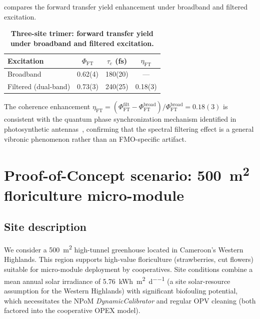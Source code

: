 \documentclass[11pt,a4paper]{article}
\begin{document}
 compares the forward transfer yield enhancement under broadband and filtered excitation.

\begin{table}[htbp]
\centering
\caption{\textbf{Three-site trimer: forward transfer yield under broadband and filtered excitation.}}
\label{tab:SI_trimer_results}
\begin{tabular}{l S[table-format=1.2(1)] S[table-format=3.0(2)] S[table-format=1.2(1)]}
\toprule
Excitation & {$\Phi_{\mathrm{FT}}$} & {$\tau_c$ (fs)} & {$\eta_{\mathrm{FT}}$} \\
\midrule
Broadband & 0.62(4) & 180(20) & {---} \\
Filtered (dual-band) & 0.73(3) & 240(25) & 0.18(3) \\
\bottomrule
\end{tabular}
\end{table}

The coherence enhancement $\eta_{\mathrm{FT}} = (\Phi_{\mathrm{FT}}^{\mathrm{filt}} - \Phi_{\mathrm{FT}}^{\mathrm{broad}}) / \Phi_{\mathrm{FT}}^{\mathrm{broad}} = 0.18(3)$ is consistent with the quantum phase synchronization mechanism identified in photosynthetic antennas~\cite{Zhu2024}, confirming that the spectral filtering effect is a general vibronic phenomenon rather than an FMO-specific artifact.


\section{Proof-of-Concept scenario: \texorpdfstring{\qty{500}{\m\squared}}{500 m\texttwosuperior} floriculture micro-module}
\label{SI-sec:poc}

\subsection{Site description}

We consider a \qty{500}{\m\squared} high-tunnel greenhouse located in Cameroon's Western Highlands.
This region supports high-value floriculture (strawberries, cut flowers) suitable for micro-module deployment by cooperatives. Site conditions combine a mean annual solar irradiance of \qty{5.76}{\kWh\per\m\squared\per\day} (a site solar-resource assumption for the Western Highlands) with significant biofouling potential, which necessitates the NPoM \textit{DynamicCalibrator} and regular OPV cleaning (both factored into the cooperative OPEX model).
\end{document}

